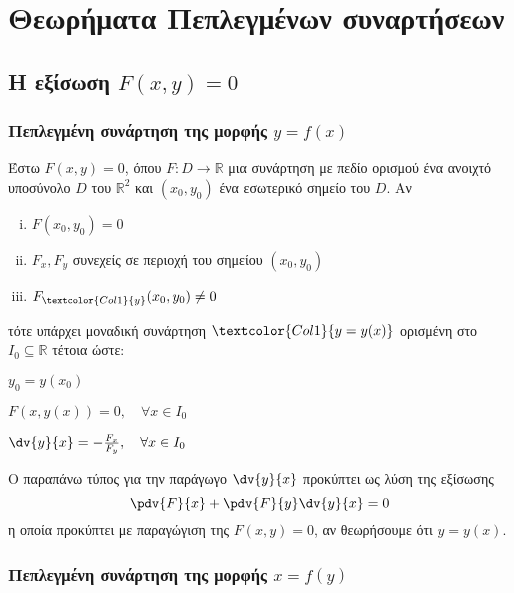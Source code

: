 \documentclass[a4paper,table]{report}
\begin{document}
\section{Θεωρήματα Πεπλεγμένων συναρτήσεων}

\vspace{\baselineskip}

\subsection{Η εξίσωση \ensuremath{F(x,y) = 0}}

\subsubsection{Πεπλεγμένη συνάρτηση της μορφής \ensuremath{y=f(x)}}

Έστω $ F(x,y) = 0 $, όπου $ F\colon D \to \mathbb{R} $ μια συνάρτηση με πεδίο
ορισμού ένα ανοιχτό υποσύνολο $D$ του $\mathbb{R}^{2}$ και $ (x_0,y_0) $ ένα 
εσωτερικό σημείο του $D$.  Αν 
\begin{enumerate}[(i)]
  \item $F(x_0,y_0) = 0$ 
  \item $ F_x, F_y$ συνεχείς σε περιοχή του σημείου $ (x_0,y_0) $ 
  \item $ F_{\textcolor{Col1}{y}}(x_0,y_0) \neq 0 $
\end{enumerate}
τότε υπάρχει μοναδική συνάρτηση $\textcolor{Col1}{y=y(x)} $ ορισμένη στο 
$ I_0 \subseteq \mathbb{R} $ τέτοια ώστε:
\begin{myitemize}
  \item $y_0 = y(x_0)$
  \item $F(x,y(x)) = 0, \quad \forall x \in I_0$
  \item $ \dv{y}{x} = - \frac{F_x}{F_y}, \quad \forall x \in I_0  $
\end{myitemize}

\begin{rem}
  Ο παραπάνω τύπος για την παράγωγο $ \dv{y}{x} $ προκύπτει ως λύση της εξίσωσης
  \[
    \pdv{F}{x} + \pdv{F}{y}\dv{y}{x} = 0 
  \] 
  η οποία προκύπτει με παραγώγιση της $ F(x,y) = 0$, αν θεωρήσουμε ότι $ y=y(x) $.
\end{rem}

\subsubsection{Πεπλεγμένη συνάρτηση της μορφής \ensuremath{x=f(y)}}
\end{document}
